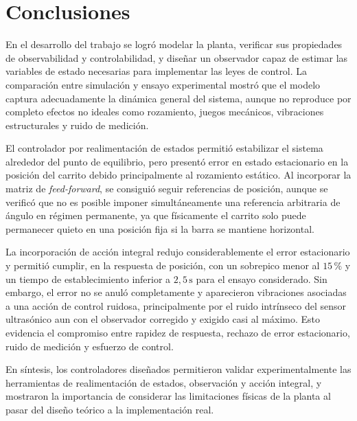 \documentclass[a4paper,12pt]{article}
\begin{document}


\section{Conclusiones}

En el desarrollo del trabajo se logró modelar la planta, verificar sus propiedades de observabilidad y controlabilidad, y diseñar un observador capaz de estimar las variables de estado necesarias para implementar las leyes de control. La comparación entre simulación y ensayo experimental mostró que el modelo captura adecuadamente la dinámica general del sistema, aunque no reproduce por completo efectos no ideales como rozamiento, juegos mecánicos, vibraciones estructurales y ruido de medición.

El controlador por realimentación de estados permitió estabilizar el sistema alrededor del punto de equilibrio, pero presentó error en estado estacionario en la posición del carrito debido principalmente al rozamiento estático. Al incorporar la matriz de \textit{feed-forward}, se consiguió seguir referencias de posición, aunque se verificó que no es posible imponer simultáneamente una referencia arbitraria de ángulo en régimen permanente, ya que físicamente el carrito solo puede permanecer quieto en una posición fija si la barra se mantiene horizontal.

La incorporación de acción integral redujo considerablemente el error estacionario y permitió cumplir, en la respuesta de posición, con un sobrepico menor al $15\,\text{\%}$ y un tiempo de establecimiento inferior a $2,5\,\text{s}$ para el ensayo considerado. Sin embargo, el error no se anuló completamente y aparecieron vibraciones asociadas a una acción de control ruidosa, principalmente por el ruido intrínseco del sensor ultrasónico aun con el observador corregido y exigido casi al máximo. Esto evidencia el compromiso entre rapidez de respuesta, rechazo de error estacionario, ruido de medición y esfuerzo de control.

En síntesis, los controladores diseñados permitieron validar experimentalmente las herramientas de realimentación de estados, observación y acción integral, y mostraron la importancia de considerar las limitaciones físicas de la planta al pasar del diseño teórico a la implementación real.
\end{document}
